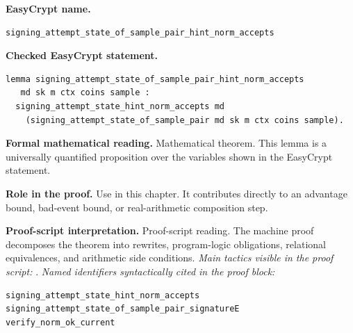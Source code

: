 \begin{formaltheorem}
\noindent\textbf{EasyCrypt name.}
\begin{lstlisting}[language=EasyCrypt,basicstyle=\ttfamily\scriptsize]
signing_attempt_state_of_sample_pair_hint_norm_accepts
\end{lstlisting}
\noindent\textbf{Checked EasyCrypt statement.}
\begin{lstlisting}[language=EasyCrypt,basicstyle=\ttfamily\scriptsize]
lemma signing_attempt_state_of_sample_pair_hint_norm_accepts
   md sk m ctx coins sample :
  signing_attempt_state_hint_norm_accepts md
    (signing_attempt_state_of_sample_pair md sk m ctx coins sample).
\end{lstlisting}
\noindent\textbf{Formal mathematical reading.}
Mathematical theorem. This lemma is a universally quantified proposition over the variables shown in the EasyCrypt statement.

\noindent\textbf{Role in the proof.}
Use in this chapter. It contributes directly to an advantage bound, bad-event bound, or real-arithmetic composition step.

\noindent\textbf{Proof-script interpretation.}
Proof-script reading. The machine proof decomposes the theorem into rewrites, program-logic obligations, relational equivalences, and arithmetic side conditions.
\emph{Main tactics visible in the proof script:} .
\emph{Named identifiers syntactically cited in the proof block:}
\begin{lstlisting}[language=EasyCrypt,basicstyle=\ttfamily\scriptsize]
signing_attempt_state_hint_norm_accepts
signing_attempt_state_of_sample_pair_signatureE
verify_norm_ok_current
\end{lstlisting}

\end{formaltheorem}

